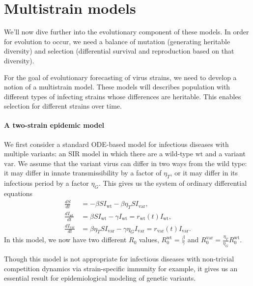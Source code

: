 \section{Multistrain models}

We'll now dive further into the evolutionary component of these models. 
In order for evolution to occur, we need a balance of mutation (generating heritable diversity) and selection (differential survival and reproduction based on that diversity).

For the goal of evolutionary forecasting of virus strains, we need to develop a notion of a multistrain model.
These models will describes population with different types of infecting strains whose differences are heritable.
This enables selection for different strains over time.

\paragraph{A two-strain epidemic model}%


We first consider a standard ODE-based model for infectious diseases with multiple variants: an SIR model in which there are a wild-type $\text{wt}$ and a variant $\text{var}$. 
We assume that the variant virus can differ in two ways from the wild type: it may differ in innate transmissibility by a factor of $\eta_{T}$, or it may differ in its infectious period by a factor $\eta_{G}$. 
This gives us the system of ordinary differential equations
\begin{align}
    \frac{d S}{d t} &= - \beta S I_{\text{wt}} - \beta \eta_{T} S I_{\text{var}},\\
  \frac{d I_{\text{wt}} }{d t} &= \beta S I_{\text{wt}} - \gamma I_{\text{wt}} = r_{\text{wt}}(t) I_{\text{wt}},\\
  \frac{d I_{\text{var}}}{d t} &= \beta \eta_{T} S I_{\text{var}} - \gamma \eta_{G} I_{\text{var}} = r_{\text{var}}(t) I_{\text{var}}.
\end{align}
In this model, we now have two different $R_{0}$ values, $R_{0}^{\text{wt}} = \frac{\beta}{\gamma}$ and $R_{0}^{\text{var}} = \frac{\eta_{T}}{\eta_{G}}R_{0}^{\text{wt}}$.

Though this model is not appropriate for infectious diseases with non-trivial competition dynamics via strain-specific immunity for example, it gives us an essential result for epidemiological modeling of genetic variants. %

